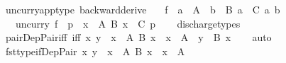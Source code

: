 \begin{isabellebody}
\endisatagproof
{\isafoldproof}%
%
\isadelimproof
\isanewline
%
\endisadelimproof
\isanewline
\isanewline
{}\isamarkupfalse%
\ uncurry{\isacharunderscore}{\kern0pt}app{\isacharunderscore}{\kern0pt}type\ {\isacharbrackleft}{\kern0pt}backward{\isacharunderscore}{\kern0pt}derive{\isacharbrackright}{\kern0pt}{\isacharcolon}{\kern0pt}\isanewline
\ \ \ {\isachardoublequoteopen}f\ {\isacharcolon}{\kern0pt}\ {\isacharparenleft}{\kern0pt}a\ {\isacharcolon}{\kern0pt}\ A{\isacharparenright}{\kern0pt}\ {\isasymRightarrow}\ {\isacharparenleft}{\kern0pt}b\ {\isacharcolon}{\kern0pt}\ B\ a{\isacharparenright}{\kern0pt}\ {\isasymRightarrow}\ C\ {\isasymlangle}a{\isacharcomma}{\kern0pt}\ b{\isasymrangle}{\isachardoublequoteclose}\isanewline
\ \ \ {\isachardoublequoteopen}uncurry\ f\ {\isacharcolon}{\kern0pt}\ {\isacharparenleft}{\kern0pt}p\ {\isacharcolon}{\kern0pt}\ {\isasymSum}x\ {\isacharcolon}{\kern0pt}\ A{\isachardot}{\kern0pt}\ {\isacharparenleft}{\kern0pt}B\ x{\isacharparenright}{\kern0pt}{\isacharparenright}{\kern0pt}\ {\isasymRightarrow}\ C\ p{\isachardoublequoteclose}\isanewline
%
\isadelimproof
\ \ %
\endisadelimproof
%
\isatagproof
{}\isamarkupfalse%
\ discharge{\isacharunderscore}{\kern0pt}types%
\endisatagproof
{\isafoldproof}%
%
\isadelimproof
\isanewline
%
\endisadelimproof
\isanewline
{}\isamarkupfalse%
\ pair{\isacharunderscore}{\kern0pt}Dep{\isacharunderscore}{\kern0pt}Pair{\isacharunderscore}{\kern0pt}iff\ {\isacharbrackleft}{\kern0pt}iff{\isacharbrackright}{\kern0pt}{\isacharcolon}{\kern0pt}\ {\isachardoublequoteopen}{\isasymlangle}x{\isacharcomma}{\kern0pt}\ y{\isasymrangle}\ {\isacharcolon}{\kern0pt}\ {\isasymSum}x\ {\isacharcolon}{\kern0pt}\ A{\isachardot}{\kern0pt}\ {\isacharparenleft}{\kern0pt}B\ x{\isacharparenright}{\kern0pt}\ {\isasymlongleftrightarrow}\ x\ {\isacharcolon}{\kern0pt}\ A\ {\isasymand}\ y\ {\isacharcolon}{\kern0pt}\ B\ x{\isachardoublequoteclose}\isanewline
%
\isadelimproof
\ \ %
\endisadelimproof
%
\isatagproof
{}\isamarkupfalse%
\ auto%
\endisatagproof
{\isafoldproof}%
%
\isadelimproof
\isanewline
%
\endisadelimproof
\isanewline
{}\isamarkupfalse%
\ fst{\isacharunderscore}{\kern0pt}type{\isacharunderscore}{\kern0pt}if{\isacharunderscore}{\kern0pt}Dep{\isacharunderscore}{\kern0pt}Pair{\isacharcolon}{\kern0pt}\ {\isachardoublequoteopen}{\isasymlangle}x{\isacharcomma}{\kern0pt}\ y{\isasymrangle}\ {\isacharcolon}{\kern0pt}\ {\isasymSum}x\ {\isacharcolon}{\kern0pt}\ A{\isachardot}{\kern0pt}\ {\isacharparenleft}{\kern0pt}B\ x{\isacharparenright}{\kern0pt}\ {\isasymLongrightarrow}\ x\ {\isacharcolon}{\kern0pt}\ A{\isachardoublequoteclose}\isanewline

\end{isabellebody}
